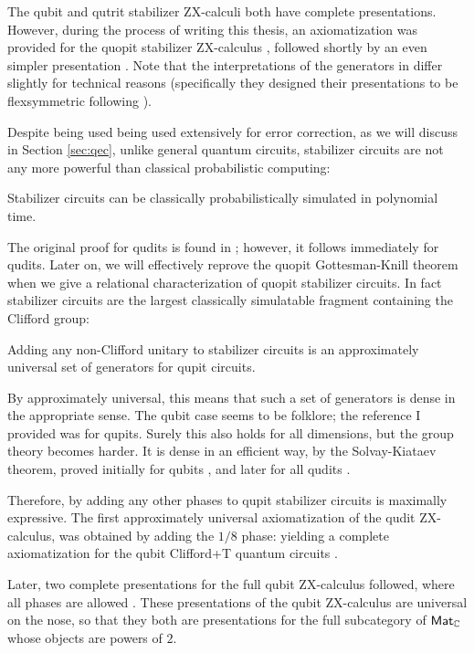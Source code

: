 The qubit \cite{backensstab,backens2015} and qutrit \cite{qutrit} stabilizer ZX-calculi both have complete presentations.  However, during the process of writing this thesis, an axiomatization was provided for the quopit stabilizer ZX-calculus \cite{booth}, followed shortly by an even simpler presentation \cite{poor}.  Note that the interpretations of the generators in \cite{poor,booth} differ slightly for technical reasons (specifically they designed their presentations to be flexsymmetric following \cite[\S 5]{flexsymmetric}).


Despite being used being used extensively for error correction, as we will discuss in Section \ref{sec:qec}, unlike general quantum circuits, stabilizer circuits are not any more powerful than classical probabilistic computing:
\begin{theorem}
\label{thm:gotteknill}
Stabilizer circuits can be classically probabilistically  simulated in polynomial time.
\end{theorem}
The original proof for qudits is found in  \cite{gottesmanknill}; however, it follows immediately for qudits.  Later on, we will effectively reprove the quopit Gottesman-Knill theorem when we give a relational characterization of quopit stabilizer circuits.  In fact stabilizer circuits are the largest classically simulatable fragment containing the Clifford group:
\begin{proposition}
\label{prop:campbell}
Adding any non-Clifford unitary to stabilizer circuits is an approximately universal set of generators for qupit  circuits.
\end{proposition}
By approximately universal, this means that such a set of generators is dense in the appropriate sense.
The qubit case seems to be folklore; the reference I provided was for qupits.  Surely this also holds for all dimensions, but the group theory becomes harder.  It is dense in an efficient way, by the Solvay-Kiataev theorem, proved initially for qubits  \cite{Kitaev1997}, and later for all qudits \cite[\S 5]{Dawson2006}.

Therefore, by adding any other phases to qupit stabilizer circuits is maximally expressive.  The first approximately universal axiomatization of the qudit ZX-calculus, was obtained by adding the $1/8$ phase: yielding a complete axiomatization for the qubit  Clifford+T quantum circuits \cite{Jeandel}.

Later, two complete presentations for the full qubit ZX-calculus followed,  where all phases are allowed  \cite{zxcompleteb,zxcompletea}. These presentations of the qubit ZX-calculus are universal on the nose, so that they both are presentations for the full subcategory of $\mathsf{Mat}_{\mathbb{C}}$ whose objects are powers of $2$.


